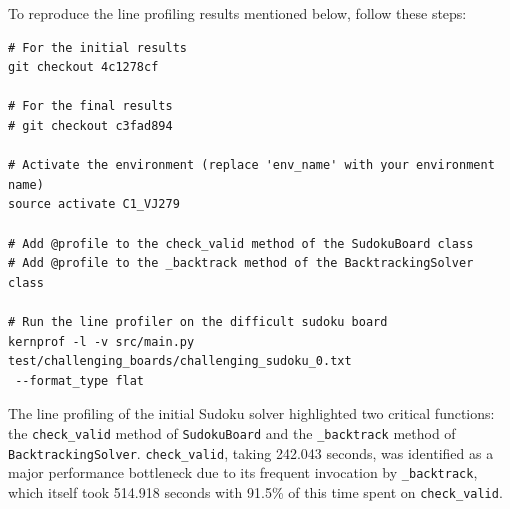 \documentclass[11pt]{article}
\begin{document}
To reproduce the line profiling results mentioned below, follow these steps:

\begin{verbatim}
# For the initial results 
git checkout 4c1278cf

# For the final results
# git checkout c3fad894

# Activate the environment (replace 'env_name' with your environment name)
source activate C1_VJ279

# Add @profile to the check_valid method of the SudokuBoard class
# Add @profile to the _backtrack method of the BacktrackingSolver class

# Run the line profiler on the difficult sudoku board
kernprof -l -v src/main.py test/challenging_boards/challenging_sudoku_0.txt
 --format_type flat
\end{verbatim}


The line profiling of the initial Sudoku solver highlighted two critical functions: the \texttt{check\_valid} method of \texttt{SudokuBoard} and the \texttt{\_backtrack} method of \texttt{BacktrackingSolver}. \texttt{check\_valid}, taking 242.043 seconds, was identified as a major performance bottleneck due to its frequent invocation by \texttt{\_backtrack}, which itself took 514.918 seconds with 91.5\% of this time spent on \texttt{check\_valid}. 
\end{document}
